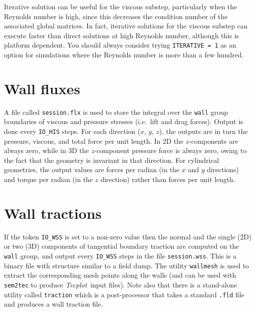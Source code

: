 \documentclass[11pt]{report}
\newcommand{\Tecplot}{\emph{Tecplot}}
\begin{document}
Iterative solution can be useful for the viscous substep, particularly
when the Reynolds number is high, since this decreases the condition
number of the associated global matrices.  In fact, iterative
solutions for the viscous substep can execute faster than direct
solutions at high Reynolds number, although this is platform
dependent. You should always consider trying \verb+ITERATIVE = 1+ as
an option for simulations where the Reynolds number is more than a few
hundred.

\section{Wall fluxes}
\label{sec.flux}

A file called \verb+session.flx+ is used to store the integral over
the \verb+wall+ group boundaries of viscous and pressure stresses
(i.e.\ lift and drag forces).  Output is done every \verb+IO_HIS+
steps.  For each direction ($x$, $y$, $z$), the outputs are in turn
the pressure, viscous, and total force per unit length.  In 2D the
$z$-components are always zero, while in 3D the $z$-component pressure
force is always zero, owing to the fact that the geometry is invariant
in that direction.  For cylindrical geometries, the output values are
forces per radian (in the $x$ and $y$ directions) and torque per
radian (in the $z$ direction) rather than forces per unit length.

\section{Wall tractions}
\label{sec.traction}

If the token \verb+IO_WSS+ is set to a non-zero value then the normal
and the single (2D) or two (3D) components of tangential boundary
traction are computed on the \verb+wall+ group, and output every
\verb+IO_WSS+ steps in the file \verb+session.wss+.  This is a binary
file with structure similar to a field dump.  The utility
\verb+wallmesh+ is used to extract the corresponding mesh points along
the walls (and can be used with \verb|sem2tec| to produce
\Tecplot\ input files). Note also that there is a stand-alone utility
called \verb+traction+ which is a post-processor that takes a standard
\verb|.fld| file and produces a wall traction file.

\end{document}

